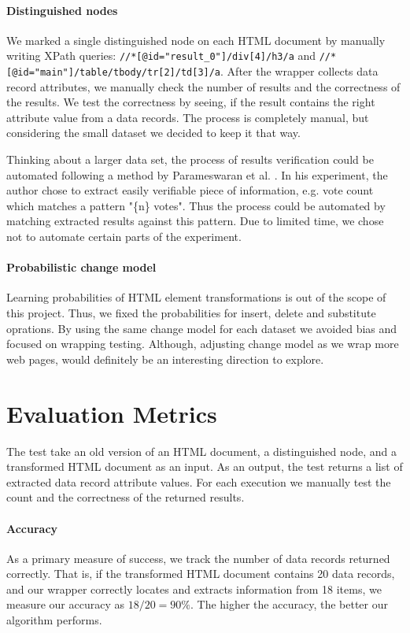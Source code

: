 \paragraph{Distinguished nodes} We marked a single distinguished node on each HTML document by manually writing XPath queries: \texttt{//*[@id="result\_0"]/div[4]/h3/a} and \texttt{//*[@id="main"]/table/tbody/tr[2]/td[3]/a}. After the wrapper collects data record attributes, we manually check the number of results and the correctness of the results. We test the correctness by seeing, if the result contains the right attribute value from a data records. The process is completely manual, but considering the small dataset we decided to keep it that way.

Thinking about a larger data set, the process of results verification could be automated following a method by Parameswaran et al. \cite{DBLP:journals/pvldb/ParameswaranDGR11}. In his experiment, the author chose to extract easily verifiable piece of information, e.g. vote count which matches a pattern "\{n\} votes". Thus the process could be automated by matching extracted results against this pattern. Due to limited time, we chose not to automate certain parts of the experiment.

\paragraph{Probabilistic change model} Learning probabilities of HTML element transformations is out of the scope of this project. Thus, we fixed the probabilities for insert, delete and substitute oprations. By using the same change model for each dataset we avoided bias and focused on wrapping testing. Although, adjusting change model as we wrap more web pages, would definitely be an interesting direction to explore.


\section{Evaluation Metrics}

The test take an old version of an HTML document, a distinguished node, and a transformed HTML document as an input. As an output, the test returns a list of extracted data record attribute values. For each execution we manually test the count and the correctness of the returned results.

\paragraph{Accuracy} As a primary measure of success, we track the number of data records returned correctly. That is, if the transformed HTML document contains 20 data records, and our wrapper correctly locates and extracts information from 18 items, we measure our accuracy as $18 / 20 = 90\%$. The higher the accuracy, the better our algorithm performs.

